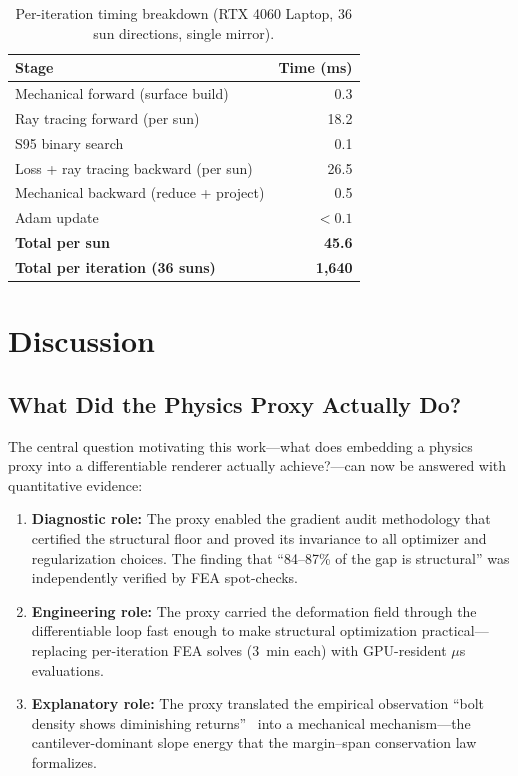 \documentclass{CVM}
\begin{document}
\begin{table}[t]
\centering
\caption{Per-iteration timing breakdown (RTX 4060 Laptop, 36 sun directions,
single mirror).}
\label{tab:timing}
\small
\begin{tabular}{lr}
\toprule
Stage & Time (ms) \\
\midrule
Mechanical forward (surface build) & 0.3 \\
Ray tracing forward (per sun) & 18.2 \\
S95 binary search & 0.1 \\
Loss + ray tracing backward (per sun) & 26.5 \\
Mechanical backward (reduce + project) & 0.5 \\
Adam update & $<0.1$ \\
\midrule
\textbf{Total per sun} & \textbf{45.6} \\
\textbf{Total per iteration (36 suns)} & \textbf{1,640} \\
\bottomrule
\end{tabular}
\end{table}

\section{Discussion}

\subsection{What Did the Physics Proxy Actually Do?}

The central question motivating this work---what does embedding a physics proxy
into a differentiable renderer actually achieve?---can now be answered with
quantitative evidence:

\begin{enumerate}
  \item \textbf{Diagnostic role:} The proxy enabled the gradient audit
  methodology that certified the structural floor and proved its invariance to
  all optimizer and regularization choices. The finding that ``84--87\% of the
  gap is structural'' was independently verified by FEA spot-checks.

  \item \textbf{Engineering role:} The proxy carried the deformation field
  through the differentiable loop fast enough to make structural optimization
  practical---replacing per-iteration FEA solves (\SI{3}{\minute} each) with
  GPU-resident $\mu$s evaluations.

  \item \textbf{Explanatory role:} The proxy translated the empirical
  observation ``bolt density shows diminishing returns''~\cite{yan2024,yan2025}
  into a mechanical mechanism---the cantilever-dominant slope energy that the
  margin--span conservation law formalizes.
\end{enumerate}
\end{document}
